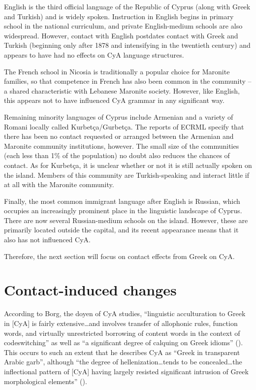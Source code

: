 \documentclass[output=paper]{langsci/langscibook}
\begin{document}
English is the third official language of the Republic of Cyprus (along with Greek and Turkish) and is widely spoken. Instruction in English begins in primary school in the national curriculum, and private English-medium schools are also widespread. However, contact with English postdates contact with Greek and Turkish (beginning only after 1878 and intensifying in the twentieth century) and appears to have had no effects on CyA language structures. 

The French school in Nicosia is traditionally a popular choice for Maronite families, so that competence in French has also been common in the community – a shared characteristic with Lebanese Maronite society. However, like English, this appears not to have influenced CyA grammar in any significant way. 

Remaining minority languages of Cyprus include Armenian and a variety of Romani locally called Kurbetça/Gurbetça. The reports of ECRML specify that there has been no contact requested or arranged between the Armenian and Maronite community institutions, however. The small size of the communities (each less than 1\% of the population) no doubt also reduces the chances of contact. As for Kurbetça, it is unclear whether or not it is still actually spoken on the island. Members of this community are Turkish-speaking and interact little if at all with the Maronite community.

Finally, the most common immigrant language after English is Russian, which occupies an increasingly prominent place in the linguistic landscape of Cyprus. There are now several Russian-medium schools on the island. However, these are primarily located outside the capital, and its recent appearance means that it also has not influenced CyA. 

Therefore, the next section will focus on contact effects from Greek on CyA.

\section{Contact-induced changes}
According to Borg, the doyen of CyA studies, “linguistic acculturation to Greek in [CyA] is fairly extensive…and involves transfer of allophonic rules, function words, and virtually unrestricted borrowing of content words in the context of codeswitching” as well as “a significant degree of calquing on Greek idioms” (\citeyear[64]{Borg2004}). This occurs to such an extent that he describes CyA as “Greek in transparent Arabic garb”, although “the degree of hellenization…tends to be concealed…the inflectional pattern of [CyA] having largely resisted significant intrusion of Greek morphological elements” (\citeyear[65]{Borg2004}).
\end{document}
